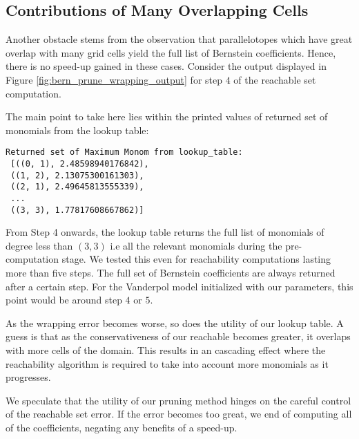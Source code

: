 \subsection{Contributions of Many Overlapping Cells}
Another obstacle stems from the observation that parallelotopes which have great overlap with many grid cells yield the full list of Bernstein coefficients. Hence, there is no speed-up gained in these cases. Consider the output displayed in Figure \ref{fig:bern_prune_wrapping_output} for step $4$ of the reachable set computation.

The main point to take here lies within the printed values of returned set of monomials from the lookup table:
%
\begin{verbatim}
Returned set of Maximum Monom from lookup_table:
 [((0, 1), 2.48598940176842),
 ((1, 2), 2.13075300161303),
 ((2, 1), 2.49645813555339),
 ...
 ((3, 3), 1.77817608667862)]
\end{verbatim}
%
From Step 4 onwards, the lookup table returns the full list of monomials of degree less than $(3,3)$ i.e all the relevant monomials during the pre-computation stage.
%
We tested this even for reachability computations lasting more than five steps. The full set of Bernstein coefficients are always returned after a certain step. For the Vanderpol model initialized with our parameters, this point would be around step $4$ or $5$.

As the wrapping error becomes worse, so does the utility of our lookup table. A guess is that as the conservativeness of our reachable becomes greater, it overlaps with more cells of the domain. This results in an cascading effect where the reachability algorithm is required to take into account more monomials as it progresses.

We speculate that the utility of our pruning method hinges on the careful control of the reachable set error. If the error becomes too great, we end of computing all of the coefficients, negating any benefits of a speed-up.
